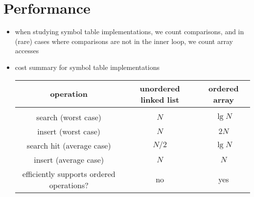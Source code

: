 \documentclass[8pt,a4paper,compress]{beamer}
\begin{document}
\section{Performance}
\begin{frame}[fragile]
\begin{itemize}
\item when studying symbol table implementations, we count comparisons, and in (rare) cases where comparisons are not in the inner loop, we count array accesses

\item cost summary for symbol table implementations
\begin{center}
\begin{tabular}{ccc}
\textbf{operation} & \textbf{unordered linked list} & \textbf{ordered array} \\ \hline \\
search (worst case) & $N$ & $\lg N$ \\
insert (worst case) & $N$ & $2N$ \\
search hit (average case) & $N/2$ & $\lg N$ \\
insert (average case) & $N$ & $N$ \\
efficiently supports ordered operations? & no & yes
\end{tabular} 
\end{center}
\end{itemize}
\end{frame}
\end{document}
